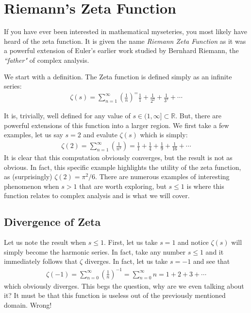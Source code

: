 \documentclass[14pt]{extarticle}
\begin{document}
\tableofcontents
\pagebreak
\setcounter{tocdepth}{3}

\section{Riemann's Zeta Function}
\localtableofcontents

\vspace{1cm}
\noindent
If you have ever been interested in mathematical myseteries, you most likely have heard of the
zeta function. It is given the name \textit{Riemann Zeta Function} as it was a powerful extension
of Euler's earlier work studied by Bernhard Riemann, the \textit{``father"} of complex analysis.

We start with a definition. The Zeta function is defined simply as an infinite series:
\begin{align*}
	\zeta(s) = \sum_{n=1}^{\infty} \left(\frac{1}{n}\right)^ = \frac{1}{1} + \frac{1}{2^2} + 
	\frac{1}{3^s} + \cdots
\end{align*}

It is, trivially, well defined for any value of $s \in (1, \infty] \subset \mathbb{R}$. But,
there are powerful extensions of this function into a larger region. We first take a few examples,
let us say $s = 2$ and evalute $\zeta(s)$ which is simply:
\begin{align*}
	\zeta(2) = \sum_{n=1}^{\infty} \left(\frac{1}{n^2}\right) = \frac{1}{1} + \frac{1}{4} + 
	\frac{1}{9} + \frac{1}{16} + \cdots
\end{align*}
It is clear that this computation obviously converges, but the result is not as obvious. In fact,
this specific example highlights the utility of the zeta function, as (surprisingly) $\zeta(2) = \pi^2 / 6$. There are numerous examples of interesting phenomenon when $s > 1$ that are worth
exploring, but $s \leq 1$ is where this function relates to complex analysis and is what we will
cover.

\subsection{Divergence of Zeta}
Let us note the result when $s \leq 1$. First, let us take $s = 1$ and notice $\zeta(s)$ will
simply become the harmonic series. In fact, take any number $s \leq 1$ and it immediately
follows that $\zeta$ diverges. In fact, let us take $s = -1$ and see that
\begin{align}
	\zeta(-1) = \sum_{n = 0}^{\infty} \left(\frac{1}{n}\right)^{-1}	= \sum_{n = 0}^{\infty} n = 1 + 2 + 3 + \cdots \label{neg_zeta}
\end{align}
which obviously diverges. This begs the question, why are we even talking about it? It must
be that this function is useless out of the previously mentioned domain. Wrong!
\end{document}
